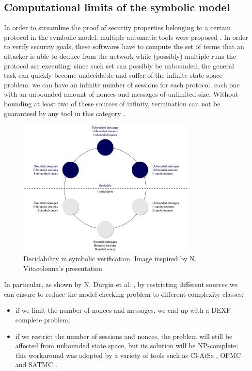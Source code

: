 \documentclass{article}
\begin{document}
\subsection{Computational limits of the symbolic model}

In order to streamline the proof of security properties belonging to a certain protocol in the symbolic model, multiple automatic tools were proposed \cite{SoK}. In order to verify security goals, these softwares have to compute the set of terms that an attacker is able to deduce from the network while (possibly) multiple runs the protocol are executing; since such set can possibly be unbounded, the general task can quickly become undecidable and suffer of the infinite state space problem: we can have an infinite number of sessions for each protocol, each one with an unbounded amount of nonces and messages of unlimited size. Without bounding at least two of these sources of infinity, termination can not be guaranteed by any tool in this category \cite{undecidability}.

\begin{figure}[t]
    \centering
    \includegraphics[width=0.8\textwidth]{images/undecidability.png}
    \caption{Decidability in symbolic verification. Image inspired by N. Vitacolonna's presentation \cite{PresentazioneVitacolonna}}
\end{figure}


In particular, as shown by N. Durgin et al. \cite{ComplexityOfBoundedSecurity}, by restricting different sources we can ensure to reduce the model checking problem to different complexity classes:

\begin{itemize}
    \item if we limit the number of nonces and messages, we end up with a DEXP-complete problem;
    \item if we restrict the number of sessions and nonces, the problem will still be affected from unbounded state space, but its solution will be NP-complete; this workaround was adopted by a variety of tools such as Cl-AtSe \cite{clAtse}, OFMC \cite{ofmc} and SATMC \cite{satmc}.
\end{itemize}
\end{document}
